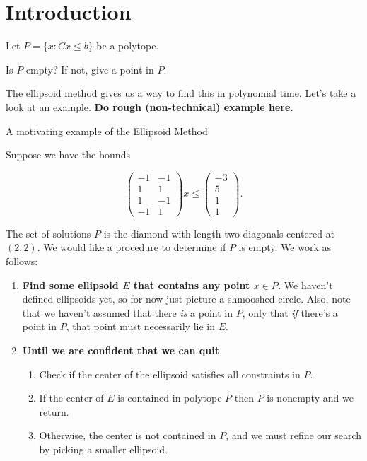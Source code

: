 \section{Introduction}
Let \(P = \{x : Cx \leq b\}\) be a polytope.
\begin{question}
  Is \(P\) empty? If not, give a point in \(P\).
\end{question}

The ellipsoid method gives us a way to find this in polynomial time. Let's take
a look at an example.  \textbf{\color{red}Do rough (non-technical) example here.}

\begin{examplebox}{A motivating example of the Ellipsoid Method}
\begin{example}
  \def\A{\left(\begin{matrix} -1 & -1 \\ 1 & 1 \\ 1 & -1 \\ -1 & 1 \end{matrix}\right) }
  \def\b{\left(\begin{matrix} -3\\ 5\\ 1\\ 1 \end{matrix}\right)}
  Suppose we have the bounds

  \[\A x \leq \b.\]
  
  The set of solutions \(P\) is the diamond with length-two diagonals centered at
  \((2,2)\). We would like a procedure to determine if \(P\) is empty. We work
  as follows:
  \begin{enumerate}
    \item \textbf{Find some ellipsoid \(E\) that contains any point \(x \in P\).}
      We haven't defined ellipsoids yet, so for now just picture a shmooshed
      circle. Also, note that we haven't assumed that there \textit{is} a point
      in \(P\), only that \textit{if} there's a point in \(P\), that point
      must necessarily lie in \(E\). 

    \item \textbf{Until we are confident that we can quit}
      \begin{enumerate}
        \item Check if the center of the ellipsoid satisfies all constraints in
          \(P\).
        \item If the center of \(E\) is contained in polytope \(P\) then
          \(P\) is nonempty and we return.

        \item Otherwise, the center is not contained in \(P\), and we must
          refine our search by picking a smaller ellipsoid.
      \end{enumerate}
  \end{enumerate}
\end{example}
\end{examplebox}


